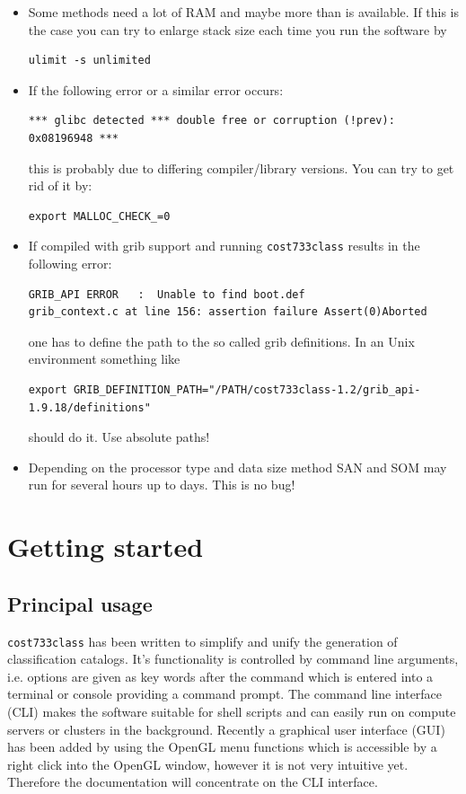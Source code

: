 \documentclass[12pt, oneside, a4paper, headsepline, plainheadsepline]{scrbook}
\begin{document}
\begin{itemize}
\item Some methods need a lot of RAM and maybe more than is available. If this is the case you can try 
to enlarge stack size each time you run the software by
\begin{lstlisting}
ulimit -s unlimited
\end{lstlisting}

\item If the following error or a similar error occurs:
\begin{lstlisting}
*** glibc detected *** double free or corruption (!prev): 0x08196948 ***
\end{lstlisting}
this is probably due to differing compiler/library versions. You can try to get rid of it by:
\begin{lstlisting}
export MALLOC_CHECK_=0
\end{lstlisting}
\item If compiled with grib support and running \verb+cost733class+ results in the following error:
\begin{lstlisting}
GRIB_API ERROR   :  Unable to find boot.def 
grib_context.c at line 156: assertion failure Assert(0)Aborted
\end{lstlisting}
one has to define the path to the so called grib definitions. In an Unix environment something like
\begin{lstlisting}
export GRIB_DEFINITION_PATH="/PATH/cost733class-1.2/grib_api-1.9.18/definitions"
\end{lstlisting}
should do it. Use absolute paths!

\item Depending on the processor type and data size method SAN and SOM may run for several hours up to days. This is no bug!
\end{itemize}
\chapter{Getting started}

\section{Principal usage}

\verb+cost733class+ has been written to simplify and unify the generation of classification catalogs.
It's functionality is controlled by command line arguments, i.e. options are given as key words after the command which is entered into a
terminal or console providing a command prompt. The command line interface (CLI) makes the software suitable for shell scripts and 
can easily run on compute servers or clusters in the background.
Recently a graphical user interface (GUI) has been added by using the OpenGL menu functions which is accessible by a right click into the 
OpenGL window, however it is not very intuitive yet. Therefore the documentation will concentrate on the CLI interface.
\end{document}
